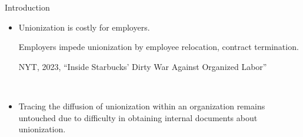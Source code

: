 \begin{frame}{Introduction}
\begin{itemize}
    \item Unionization is costly for employers. 
    
    Employers impede unionization by employee relocation, contract termination.
    
    NYT, 2023,  “Inside Starbucks’ Dirty War Against Organized Labor”

    \
    
    \item Tracing the diffusion of unionization within an organization remains untouched due to difficulty in obtaining internal documents about unionization.

\end{itemize}
\end{frame}